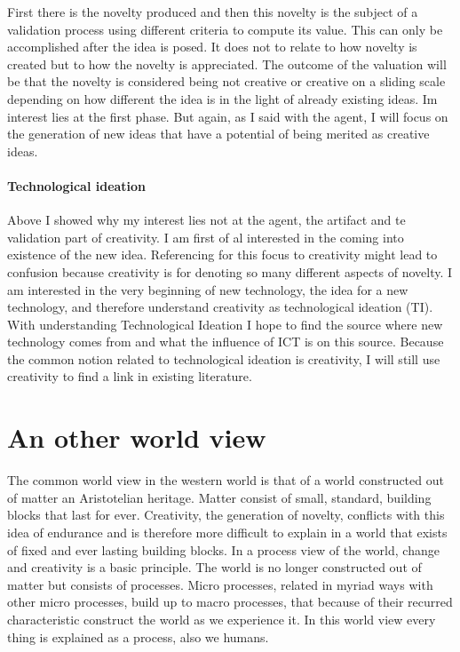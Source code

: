 \documentclass[a4paper]{Thesis}
\begin{document}
First there is the novelty produced and then this novelty is the subject of a validation process using different criteria to compute its value.
This can only be accomplished after the idea is posed. It does not to relate to how novelty is created but to how the novelty is appreciated. 
The outcome of the valuation will be that the novelty is considered being not creative or creative on a sliding scale depending on how different the idea is in the light of already existing ideas.
Im interest lies at the first phase. But again, as I said with the agent, I will focus on the generation of new ideas that have a potential of being merited as creative ideas.

\paragraph{Technological ideation}
Above I showed why my interest lies not at the agent, the artifact and te validation part of creativity. I am first of al interested in the coming into existence of the new idea.  
Referencing for this focus to creativity might lead to confusion because creativity is for denoting so many different aspects of novelty. I am interested in the very beginning of new technology, the idea for a new technology, and therefore understand creativity as technological ideation (TI). 
With understanding Technological Ideation I hope to find the source where new technology comes from and what the influence of ICT is on this source.
Because the common notion related to technological ideation is creativity, I will still use creativity to find a link in existing literature. 


\section{An other world view}
The common world view in the western world is that of a world constructed out of matter an Aristotelian heritage. Matter consist of small, standard, building blocks that last for ever. 
Creativity, the generation of novelty, conflicts with this idea of endurance and is therefore more difficult to explain in a world that exists of fixed and ever lasting building blocks.
In a process view of the world, change and creativity is a basic principle. The world is no longer constructed out of matter but consists of processes. Micro processes, related in myriad ways with other micro processes, build up to macro processes, that because of their recurred characteristic construct the world as we experience it. In this world view every thing is explained as a process, also we humans. 
\end{document}
